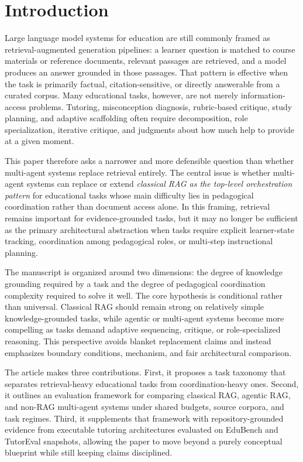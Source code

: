 \section{Introduction}

Large language model systems for education are still commonly framed as retrieval-augmented generation pipelines: a learner question is matched to course materials or reference documents, relevant passages are retrieved, and a model produces an answer grounded in those passages. That pattern is effective when the task is primarily factual, citation-sensitive, or directly answerable from a curated corpus. Many educational tasks, however, are not merely information-access problems. Tutoring, misconception diagnosis, rubric-based critique, study planning, and adaptive scaffolding often require decomposition, role specialization, iterative critique, and judgments about how much help to provide at a given moment.

This paper therefore asks a narrower and more defensible question than whether multi-agent systems replace retrieval entirely. The central issue is whether multi-agent systems can replace or extend \emph{classical RAG as the top-level orchestration pattern} for educational tasks whose main difficulty lies in pedagogical coordination rather than document access alone. In this framing, retrieval remains important for evidence-grounded tasks, but it may no longer be sufficient as the primary architectural abstraction when tasks require explicit learner-state tracking, coordination among pedagogical roles, or multi-step instructional planning.

The manuscript is organized around two dimensions: the degree of knowledge grounding required by a task and the degree of pedagogical coordination complexity required to solve it well. The core hypothesis is conditional rather than universal. Classical RAG should remain strong on relatively simple knowledge-grounded tasks, while agentic or multi-agent systems become more compelling as tasks demand adaptive sequencing, critique, or role-specialized reasoning. This perspective avoids blanket replacement claims and instead emphasizes boundary conditions, mechanism, and fair architectural comparison.

The article makes three contributions. First, it proposes a task taxonomy that separates retrieval-heavy educational tasks from coordination-heavy ones. Second, it outlines an evaluation framework for comparing classical RAG, agentic RAG, and non-RAG multi-agent systems under shared budgets, source corpora, and task regimes. Third, it supplements that framework with repository-grounded evidence from executable tutoring architectures evaluated on EduBench and TutorEval snapshots, allowing the paper to move beyond a purely conceptual blueprint while still keeping claims disciplined.

